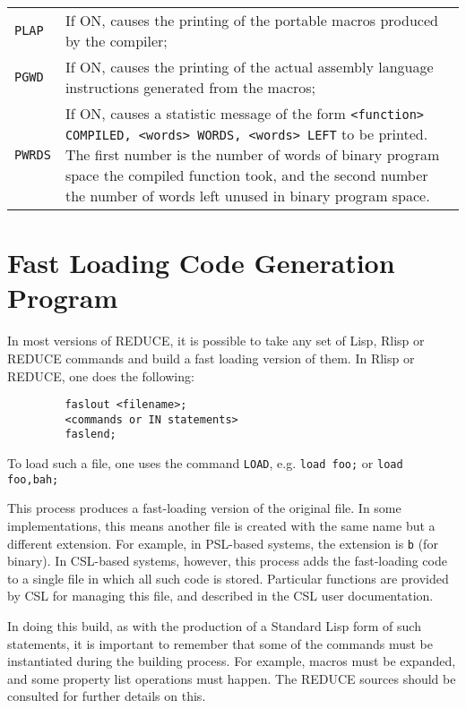 \documentclass[11pt,letterpaper]{book}
\makeatletter
\newlength{\reduceboxwidth}
\newcommand{\REDUCE}{REDUCE}
\newcommand{\underscore}{\_}
\newcommand{\ttindex}[1]{{\renewcommand{\_}{\protect\underscore}%
                          \index{#1@{\tt #1}}}}
\makeatother
\begin{document}
{\renewcommand{\arraystretch}{2}
\begin{tabular}{lp{\reduceboxwidth}}
{\tt PLAP} & If ON, causes the printing of the
portable macros produced by the compiler; \\
%
{\tt PGWD} & If ON, causes the printing of the
actual assembly language instructions generated from the macros; \\
%
{\tt PWRDS} & If ON, causes a statistic
message of the form \newline
{\tt    <function> COMPILED, <words> WORDS, <words> LEFT} \newline
to be printed.  The first number is the number of words of binary
program space the compiled function took, and the second number
the number of words left unused in binary program space. \\
\end{tabular}}

\section{Fast Loading Code Generation Program}
\label{sec-load}
In most versions of {\REDUCE}, it is possible to take any set of Lisp, Rlisp
or {\REDUCE} commands and build a fast loading version of them. In Rlisp or
{\REDUCE}, one does the following:
{\small\begin{verbatim}
         faslout <filename>;
         <commands or IN statements>
         faslend;
\end{verbatim}}
To load such a file, one uses the command {\tt LOAD},\ttindex{LOAD}
e.g. {\tt load foo;}
or {\tt load foo,bah;}

This process produces a fast-loading version of the original file.  In some
implementations, this means another file is created with the same name but
a different extension. For example, in PSL-based systems, the extension is
{\tt b} (for binary). In CSL-based systems, however, this process adds the
fast-loading code to a single file in which all such code is stored.
Particular functions are provided by CSL for managing this file, and
described in the CSL user documentation.

In doing this build, as with the production of a Standard Lisp form of
such statements, it is important to remember that some of the commands
must be instantiated during the building process.  For example, macros
must be expanded, and some property list operations must happen.
The {\REDUCE} sources should be consulted for further details on this.
\end{document}
